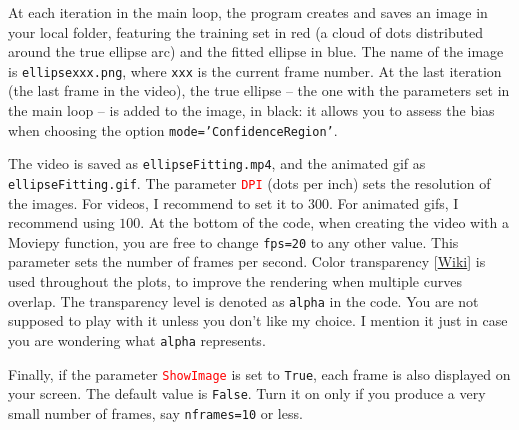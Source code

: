 \documentclass[oneside,10pt]{book}
\begin{document}
\noindent At each iteration in the main loop, the program creates and saves an image in your local folder, featuring the training set in red (a cloud of dots distributed around the true ellipse arc) and the fitted ellipse in blue. The name of the image is 
\texttt{ellipsexxx.png}, where \texttt{xxx} is
 the current frame number.  At the last iteration (the last frame in the video), the true ellipse -- the one with the parameters set in the main loop -- is added to the image, in black:  it allows you to assess the bias when choosing
 the option \texttt{mode='ConfidenceRegion'}. 

The video is saved as
  \texttt{ellipseFitting.mp4}, and the animated gif as \texttt{ellipseFitting.gif}.
The parameter \textcolor{red}{\texttt{DPI}} (dots per inch) sets the resolution of the images. For videos, I recommend to set it to $300$. For animated gifs, I recommend using $100$. At the bottom of the code, when creating the video with a Moviepy function, you are free  
 to change \texttt{fps=20} to any other value. This parameter sets the number of frames per second. 
\textcolor{index}{Color transparency} [\href{https://en.wikipedia.org/wiki/Alpha_compositing}{Wiki}] is used throughout the plots, to improve the rendering when multiple curves overlap. The transparency level is denoted as \texttt{alpha} in the code. You are not supposed to play with it unless
 you don't like my choice. I mention it just in case you are wondering what \texttt{alpha} represents.

Finally, if the parameter \textcolor{red}{\texttt{ShowImage}} is set to \texttt{True}, each 
 frame is also displayed on your screen. The default value is \texttt{False}. Turn it on only
 if you produce a very small number of frames, say \texttt{nframes=10} or less.\\
\end{document}
